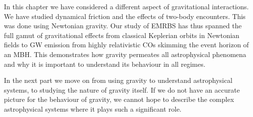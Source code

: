 In this chapter we have considered a different aspect of gravitational interactions. We have studied dynamical friction and the effects of two-body encounters. This was done using Newtonian gravity. Our study of EMRBS has thus spanned the full gamut of gravitational effects from classical Keplerian orbits in Newtonian fields to GW emission from highly relativistic COs skimming the event horizon of an MBH. This demonstrates how gravity permeates all astrophysical phenomena and why it is important to understand its behaviour in all regimes.

In the next part we move on from using gravity to understand astrophysical systems, to studying the nature of gravity itself. If we do not have an accurate picture for the behaviour of gravity, we cannot hope to describe the complex astrophysical systems where it plays such a significant role.
